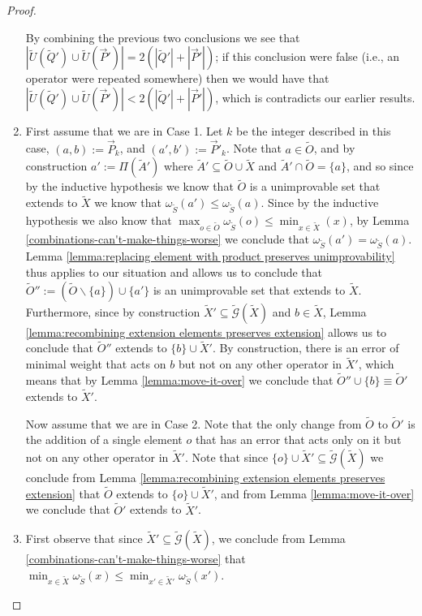\documentclass[12pt]{amsbook}
\theoremstyle{plain}
\theoremstyle{definition}
\theoremstyle{remark}
\newcommand{\lst}{\vec}
\newcommand{\set}{\tilde}
\newcommand{\genfun}{\tilde{\mathcal{G}}}
\newcommand{\om}{\omega}
\newcommand{\paren}[1]{\left(#1\right)}
\begin{document}
\begin{proof}
\begin{enumerate}
By combining the previous two conclusions we see that $|\set U(\set Q')\cup\set U(\lst P')|=2(|\set Q'|+|\lst P'|)$;  if this conclusion were false (i.e., an operator were repeated somewhere) then we would have that $|\set U(\set Q')\cup\set U(\lst P')|<2(|\set Q'|+|\lst P'|)$, which is contradicts our earlier results.
\item

First assume that we are in Case 1.  Let $k$ be the integer described in this case, $(a,b):=\lst P_k$, and $(a',b'):=\lst P'_k$.  Note that $a\in\set O$, and by construction $a':=\Pi(\set A')$ where $\set A'\subseteq \set O\cup\set X$ and $\set A'\cap\set O=\{a\}$, and so since by the inductive hypothesis we know that $\set O$ is a unimprovable set that extends to $\set X$ we know that $\om_{\set S}(a')\le\om_{\set S}(a)$.  Since by the inductive hypothesis we also know that $\max_{o\in\set O}\om_{\set S}(o)\le\min_{x\in\set X}(x)$, by Lemma \ref{combinations-can't-make-things-worse} we conclude that $\om_{\set S}(a')=\om_{\set S}(a)$.  Lemma \ref{lemma:replacing element with product preserves unimprovability} thus applies to our situation and allows us to conclude that $\set O'':=\paren{\set O\backslash\{a\}}\cup\{a'\}$ is an unimprovable set that extends to $\set X$.  Furthermore, since by construction $\set X'\subseteq\genfun(\set X)$ and $b\in\set X$, Lemma \ref{lemma:recombining extension elements preserves extension} allows us to conclude that $\set O''$ extends to $\{b\}\cup\set X'$.  By construction, there is an error of minimal weight that acts on $b$ but not on any other operator in $\set X'$, which means that by Lemma \ref{lemma:move-it-over} we conclude that $\set O''\cup\{b\}\equiv\set O'$ extends to $\set X'$.

Now assume that we are in Case 2.  Note that the only change from $\set O$ to $\set O'$ is the addition of a single element $o$ that has an error that acts only on it but not on any other operator in $\set X'$.  Note that since $\{o\}\cup\set X'\subseteq\genfun(\set X)$ we conclude from Lemma \ref{lemma:recombining extension elements preserves extension} that $\set O$ extends to $\{o\}\cup\set X'$, and from Lemma \ref{lemma:move-it-over} we conclude that $\set O'$ extends to $\set X'$.
\item

First observe that since $\set X'\subseteq\genfun(\set X)$, we conclude from Lemma \ref{combinations-can't-make-things-worse} that $\min_{x\in\set X}\om_{\set S}(x)\le\min_{x'\in\set X'}\om_{\set S}(x')$.


\end{enumerate}
\end{proof}
\end{document}
